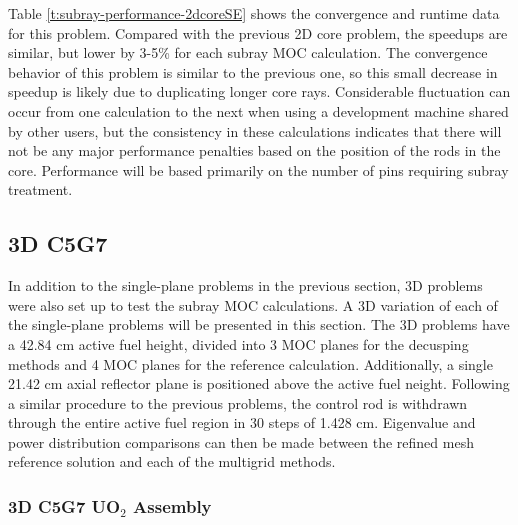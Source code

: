 Table \ref{t:subray-performance-2dcoreSE} shows the convergence and runtime data for this problem.  Compared with the previous 2D core problem, the speedups are similar, but lower by 3-5\% for each subray MOC calculation.  The convergence behavior of this problem is similar to the previous one, so this small decrease in speedup is likely due to duplicating longer core rays.  Considerable fluctuation can occur from one calculation to the next when using a development machine shared by other users, but the consistency in these calculations indicates that there will not be any major performance penalties based on the position of the rods in the core.  Performance will be based primarily on the number of pins requiring subray treatment.

\subsection{3D C5G7}

In addition to the single-plane problems in the previous section, 3D problems were also set up to test the subray MOC calculations.  A 3D variation of each of the single-plane problems will be presented in this section.  The 3D problems have a 42.84 cm active fuel height, divided into 3 MOC planes for the decusping methods and 4 MOC planes for the reference calculation.  Additionally, a single 21.42 cm axial reflector plane is positioned above the active fuel neight.  Following a similar procedure to the previous problems, the control rod is withdrawn through the entire active fuel region in 30 steps of 1.428 cm.  Eigenvalue and power distribution comparisons can then be made between the refined mesh reference solution and each of the multigrid methods.

\subsubsection{3D C5G7 UO\texorpdfstring{$_2$}{2} Assembly}

